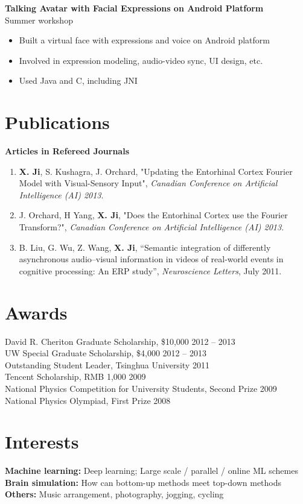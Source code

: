 \documentclass[margin]{res}
\begin{document}
\begin{resume}
 {\bf Talking Avatar with Facial Expressions on Android Platform}\\
 Summer workshop
  \begin{itemize} \itemsep -2pt
   \item Built a virtual face with expressions and voice on Android platform
   \item Involved in expression modeling, audio-video sync, UI design, etc.
   \item Used Java and C, including JNI
 \end{itemize}



\section{Publications} 

 {\bf Articles in Refereed Journals}\\
 \begin{enumerate} \itemsep -2pt
\item {\bf X. Ji}, S. Kushagra, J. Orchard, "Updating the Entorhinal Cortex Fourier Model with Visual-Sensory Input", {\em Canadian Conference on Artificial Intelligence (AI) 2013}.
\item J. Orchard, H Yang, {\bf X. Ji}, "Does the Entorhinal Cortex use the Fourier Transform?",  {\em Canadian Conference on Artificial Intelligence (AI) 2013}.
\item B. Liu, G. Wu, Z. Wang, {\bf X. Ji}, ``Semantic integration of differently asynchronous audio–visual information in videos of real-world events in cognitive processing: An ERP study'', {\em Neuroscience Letters}, July 2011. 
\end{enumerate}


\section{Awards}

David R. Cheriton Graduate Scholarship, \$10,000 \hfill 2012 -- 2013\\
UW Special Graduate Scholarship, \$4,000 \hfill 2012 -- 2013\\
Outstanding Student Leader, Tsinghua University \hfill 2011\\
Tencent Scholarship, RMB 1,000 \hfill 2009\\
National Physics Competition for University Students, Second Prize \hfill 2009\\
National Physics Olympiad, First Prize \hfill 2008\\



\section{Interests}
{\bf Machine learning:} Deep learning; Large scale / parallel / online ML schemes\\
{\bf Brain simulation:} How can bottom-up methods meet top-down methods\\
{\bf Others:} Music arrangement, photography, jogging, cycling\\

\end{resume} 
\end{document}
